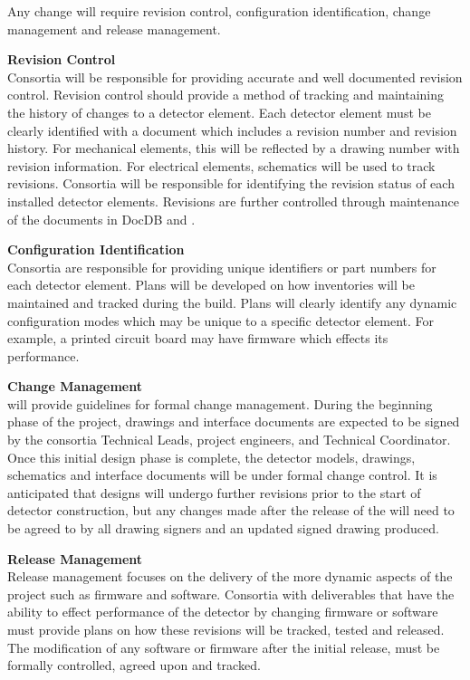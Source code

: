 Any change will require revision control, configuration
identification, change management and release management.

{\bf Revision Control}\\ Consortia will be responsible for providing
accurate and well documented revision control.  Revision control
should provide a method of tracking and maintaining the history of
changes to a detector element.  Each detector element must be clearly
identified with a document which includes a revision number and
revision history.  For mechanical elements, this will be reflected by
a drawing number with revision information.  For electrical elements,
schematics will be used to track revisions.  Consortia will be
responsible for identifying the revision status of each installed
detector elements. Revisions are further controlled through maintenance
of the documents in DocDB and .

{\bf Configuration Identification}\\
Consortia are responsible for providing unique identifiers or part
numbers for each detector element.  Plans will be developed on how
inventories will be maintained and tracked during the build.  Plans
will clearly identify any dynamic configuration modes which may be
unique to a specific detector element.  For example, a printed circuit
board may have firmware which effects its performance.

{\bf Change Management}\\
 will provide guidelines
for formal change management.  During the beginning phase of the
project, drawings and interface documents are expected to be signed by
the consortia Technical Leads, project engineers, and Technical
Coordinator.  Once this initial design phase is complete, the detector
models, drawings, schematics and interface documents will be under
formal change control.  It is anticipated that designs will undergo
further revisions prior to the start of detector construction, but any
changes made after the release of the  will
need to be agreed to by all drawing signers and an updated signed
drawing produced.

{\bf Release Management}\\
Release management focuses on the delivery of the more dynamic aspects
of the project such as firmware and software.  Consortia with
deliverables that have the ability to effect performance of the
detector by changing firmware or software must provide plans on how
these revisions will be tracked, tested and released.  The
modification of any software or firmware after the initial release,
must be formally controlled, agreed upon and tracked.


